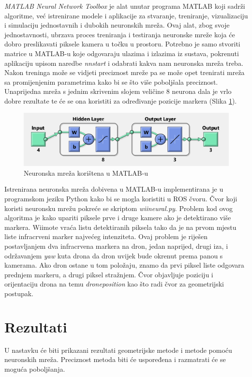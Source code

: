 \documentclass[times, utf8, diplomski]{fer}
\begin{document}
\textit{MATLAB Neural Network Toolbox} je alat unutar programa MATLAB koji sadrži algoritme, već istrenirane modele i aplikacije za stvaranje, treniranje, vizualizaciju i simulaciju jednostavnih i dubokih neuronskih mreža. Ovaj alat, zbog svoje jednostavnosti, ubrzava proces treniranja i testiranja neuronske mreže koja će dobro preslikavati piksele kamera u točku u prostoru. Potrebno je samo stvoriti matrice u MATLAB-u koje odgovaraju ulazima i izlazima iz sustava, pokrenuti aplikaciju upisom naredbe \textit{nnstart} i odabrati kakva nam neuronska mreža treba. Nakon treninga može se vidjeti preciznost mreže pa se može opet trenirati mreža sa promijenjenim parametrima kako bi se što više poboljšala preciznost. Unaprijedna mreža s jednim skrivenim slojem veličine 8 neurona dala je vrlo dobre rezultate te će se ona koristiti za određivanje pozicije markera (Slika \ref{fig:mreza8}).

\begin{figure}[h]
\centering
\includegraphics[width=.7\textwidth]{mreza}
\caption{Neuronska mreža korištena u MATLAB-u}
\label{fig:mreza8}
\end{figure} 

Istrenirana neuronska mreža dobivena u MATLAB-u implementirana je u programskom jeziku Python kako bi se mogla koristiti u ROS čvoru. Čvor koji koristi neuronsku mrežu pokreće se skriptom \textit{wii\textunderscore neural.py}. Problem kod ovog algoritma je kako upariti piksele prve i druge kamere ako je detektirano više markera. Wiimote vraća listu detektiranih piksela tako da je na prvom mjestu liste infracrveni marker najvećeg intenziteta. Ovaj problem je riješen postavljanjem dva infracrvena markera na dron, jedan naprijed, drugi iza, i održavanjem \textit{yaw} kuta drona da dron uvijek bude okrenut prema panou s kamerama. Ako dron ostane u tom položaju, znamo da prvi piksel liste odgovara prednjem markeru, a drugi piksel stražnjem. Čvor objavljuje poziciju i orijentaciju drona na temu \textit{drone\textunderscore position} kao što radi čvor za geometrijski postupak.

\chapter{Rezultati}
U nastavku će biti prikazani rezultati geometrijske metode i metode pomoću neuronskih mreža. Preciznost metoda biti će uspoređena i razmatrati će se moguća poboljšanja.
\end{document}
